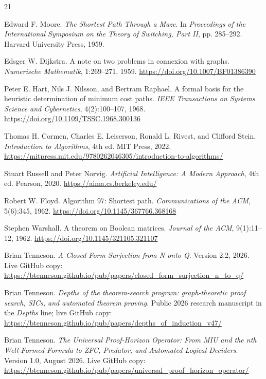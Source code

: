 \begin{thebibliography}{21}

Edward F. Moore.
\emph{The Shortest Path Through a Maze}.
In \emph{Proceedings of the International Symposium on the Theory of Switching, Part II}, pp. 285--292. Harvard University Press, 1959.

Edsger W. Dijkstra.
A note on two problems in connexion with graphs.
\emph{Numerische Mathematik}, 1:269--271, 1959.
\url{https://doi.org/10.1007/BF01386390}

Peter E. Hart, Nils J. Nilsson, and Bertram Raphael.
A formal basis for the heuristic determination of minimum cost paths.
\emph{IEEE Transactions on Systems Science and Cybernetics}, 4(2):100--107, 1968.
\url{https://doi.org/10.1109/TSSC.1968.300136}

Thomas H. Cormen, Charles E. Leiserson, Ronald L. Rivest, and Clifford Stein.
\emph{Introduction to Algorithms}, 4th ed.
MIT Press, 2022.
\url{https://mitpress.mit.edu/9780262046305/introduction-to-algorithms/}

Stuart Russell and Peter Norvig.
\emph{Artificial Intelligence: A Modern Approach}, 4th ed.
Pearson, 2020.
\url{https://aima.cs.berkeley.edu/}

Robert W. Floyd.
Algorithm 97: Shortest path.
\emph{Communications of the ACM}, 5(6):345, 1962.
\url{https://doi.org/10.1145/367766.368168}

Stephen Warshall.
A theorem on Boolean matrices.
\emph{Journal of the ACM}, 9(1):11--12, 1962.
\url{https://doi.org/10.1145/321105.321107}

Brian Tenneson.
\emph{A Closed-Form Surjection from N onto Q}.
Version 2.2, 2026. Live GitHub copy:
\url{https://btenneson.github.io/pub/papers/closed_form_surjection_n_to_q/}

Brian Tenneson.
\emph{Depths of the theorem-search program: graph-theoretic proof search, SICs, and automated theorem proving}.
Public 2026 research manuscript in the \emph{Depths} line; live GitHub copy:
\url{https://btenneson.github.io/pub/papers/depths_of_induction_v47/}

Brian Tenneson.
\emph{The Universal Proof-Horizon Operator: From MIU and the nth Well-Formed Formula to ZFC, Predator, and Automated Logical Deciders}.
Version 1.0, August 2026. Live GitHub copy:
\url{https://btenneson.github.io/pub/papers/universal_proof_horizon_operator/}


\end{thebibliography}
